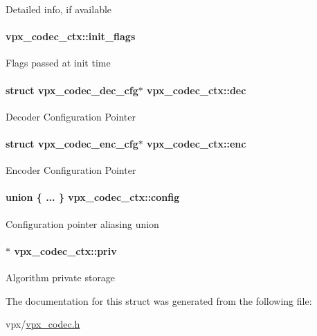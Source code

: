 \label{structvpx__codec__ctx_ad785c88ae862dd9129965c72723260bd}
\-Detailed info, if available \hypertarget{structvpx__codec__ctx_a76546548086c060a6bd21cb55037fb2b}{
\paragraph[{init\-\_\-flags}]{ {\bf vpx\-\_\-codec\-\_\-ctx\-::init\-\_\-flags}}}
\label{structvpx__codec__ctx_a76546548086c060a6bd21cb55037fb2b}
\-Flags passed at init time \hypertarget{structvpx__codec__ctx_abb82988485a036fb80e36ed22ec1e984}{
\paragraph[{dec}]{\setlength{\rightskip}{0pt plus 5cm}struct {\bf vpx\-\_\-codec\-\_\-dec\-\_\-cfg}$\ast$ {\bf vpx\-\_\-codec\-\_\-ctx\-::dec}}}
\label{structvpx__codec__ctx_abb82988485a036fb80e36ed22ec1e984}
\-Decoder \-Configuration \-Pointer \hypertarget{structvpx__codec__ctx_a3755f3c166d9aacd8a262a81ac18fa8f}{
\paragraph[{enc}]{\setlength{\rightskip}{0pt plus 5cm}struct {\bf vpx\-\_\-codec\-\_\-enc\-\_\-cfg}$\ast$ {\bf vpx\-\_\-codec\-\_\-ctx\-::enc}}}
\label{structvpx__codec__ctx_a3755f3c166d9aacd8a262a81ac18fa8f}
\-Encoder \-Configuration \-Pointer \hypertarget{structvpx__codec__ctx_aaa15a858376e55269a0a7ba5bff09f04}{
\paragraph[{config}]{\setlength{\rightskip}{0pt plus 5cm}union \{ ... \}                          {\bf vpx\-\_\-codec\-\_\-ctx\-::config}}}
\label{structvpx__codec__ctx_aaa15a858376e55269a0a7ba5bff09f04}
\-Configuration pointer aliasing union \hypertarget{structvpx__codec__ctx_acee775fd5b7580e112e245ce39733f92}{
\paragraph[{priv}]{$\ast$ {\bf vpx\-\_\-codec\-\_\-ctx\-::priv}}}
\label{structvpx__codec__ctx_acee775fd5b7580e112e245ce39733f92}
\-Algorithm private storage 

\-The documentation for this struct was generated from the following file\-:\begin{DoxyCompactItemize}
\item 
vpx/\hyperlink{vpx__codec_8h}{vpx\-\_\-codec.\-h}\end{DoxyCompactItemize}
